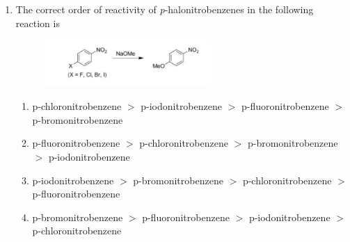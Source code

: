 \documentclass[journal,12pt,onecolumn]{exam}
\theoremstyle{remark}
\newcommand{\correct}{\textcolor{correctgreen}{\checkmark}}
\newcommand{\wrong}{\textcolor{wrongred}{\ding{55}}} %
\begin{document}
\begin{enumerate}
\begin{figure}[H]
\end{figure}

\begin{enumerate}
    \item A
    \item B
    \item C
    \item D
\end{enumerate}

\hfill{}

\begin{multicols}{2}
\begin{enumerate}
    \item \correct A
    \item \wrong B
    \item \wrong C
    \item \wrong D
\end{enumerate}
\end{multicols}


\item 
The correct order of reactivity of \emph{p}-halonitrobenzenes in the following reaction is

\begin{figure}[H]
    \centering
    \includegraphics[width=0.6\textwidth]{figs/image5.png}
    \caption{}
    \label{fig:figure5}
    
\end{figure}

\begin{enumerate}
    \item p-chloronitrobenzene $>$ p-iodonitrobenzene $>$ p-fluoronitrobenzene $>$ p-bromonitrobenzene
    \item p-fluoronitrobenzene $>$ p-chloronitrobenzene $>$ p-bromonitrobenzene $>$ p-iodonitrobenzene
    \item p-iodonitrobenzene $>$ p-bromonitrobenzene $>$ p-chloronitrobenzene $>$ p-fluoronitrobenzene
    \item p-bromonitrobenzene $>$ p-fluoronitrobenzene $>$ p-iodonitrobenzene $>$ p-chloronitrobenzene
\end{enumerate}


\end{enumerate}
\end{document}
